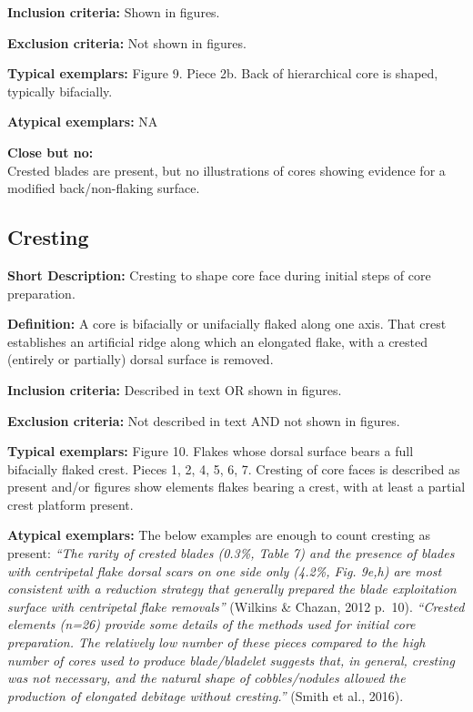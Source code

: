 \documentclass[
]{article}
\begin{document}
\textbf{Inclusion criteria:} Shown in figures.

\textbf{Exclusion criteria:} Not shown in figures.

\textbf{Typical exemplars:} Figure 9. Piece 2b. Back of hierarchical
core is shaped, typically bifacially.

\textbf{Atypical exemplars:} NA

\textbf{Close but no:}\\
Crested blades are present, but no illustrations of cores showing
evidence for a modified back/non-flaking surface.

\hypertarget{cresting}{%
\subsection{Cresting}\label{cresting}}

\textbf{Short Description:} Cresting to shape core face during initial
steps of core preparation.

\textbf{Definition:} A core is bifacially or unifacially flaked along
one axis. That crest establishes an artificial ridge along which an
elongated flake, with a crested (entirely or partially) dorsal surface
is removed.

\textbf{Inclusion criteria:} Described in text OR shown in figures.

\textbf{Exclusion criteria:} Not described in text AND not shown in
figures.

\textbf{Typical exemplars:} Figure 10. Flakes whose dorsal surface bears
a full bifacially flaked crest. Pieces 1, 2, 4, 5, 6, 7. Cresting of
core faces is described as present and/or figures show elements flakes
bearing a crest, with at least a partial crest platform present.

\textbf{Atypical exemplars:} The below examples are enough to count
cresting as present: \emph{``The rarity of crested blades (0.3\%, Table
7) and the presence of blades with centripetal flake dorsal scars on one
side only (4.2\%, Fig. 9e,h) are most consistent with a reduction
strategy that generally prepared the blade exploitation surface with
centripetal flake removals''} (Wilkins \& Chazan, 2012 p.~10).
\emph{``Crested elements (n=26) provide some details of the methods used
for initial core preparation. The relatively low number of these pieces
compared to the high number of cores used to produce blade/bladelet
suggests that, in general, cresting was not necessary, and the natural
shape of cobbles/nodules allowed the production of elongated debitage
without cresting.''} (Smith et al., 2016).
\end{document}
